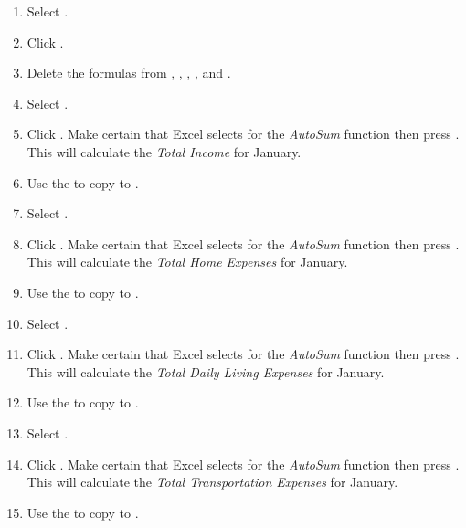 \begin{enumerate}
	\item Select .
	\item Click . 
	\item Delete the formulas from , , , , and .

	\item Select .
	\item Click . Make certain that Excel selects  for the \textit{AutoSum} function then press . This will calculate the \textit{Total Income} for January.
	\item Use the  to copy  to .

	\item Select .
	\item Click . Make certain that Excel selects  for the \textit{AutoSum} function then press . This will calculate the \textit{Total Home Expenses} for January.
	\item Use the  to copy  to .
	
	\item Select .
	\item Click . Make certain that Excel selects  for the \textit{AutoSum} function then press . This will calculate the \textit{Total Daily Living Expenses} for January.
	\item Use the  to copy  to .
	
	\item Select .
	\item Click . Make certain that Excel selects  for the \textit{AutoSum} function then press . This will calculate the \textit{Total Transportation Expenses} for January.
	\item Use the  to copy  to .


\end{enumerate}
